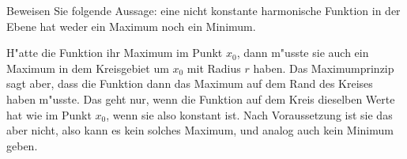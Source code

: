 Beweisen Sie folgende Aussage: eine nicht konstante harmonische Funktion in der
Ebene hat weder ein Maximum noch ein Minimum.

\begin{loesung}
H"atte die Funktion ihr Maximum im Punkt $x_0$, dann m"usste
sie auch ein Maximum in dem Kreisgebiet um $x_0$ mit Radius $r$
haben. Das Maximumprinzip sagt aber, dass die Funktion dann das
Maximum auf dem Rand des Kreises haben m"usste. Das geht nur,
wenn die Funktion auf dem Kreis dieselben Werte hat wie im
Punkt $x_0$, wenn sie also konstant ist. Nach Voraussetzung ist
sie das aber nicht, also kann es kein solches Maximum, und analog
auch kein Minimum geben.
\end{loesung}

